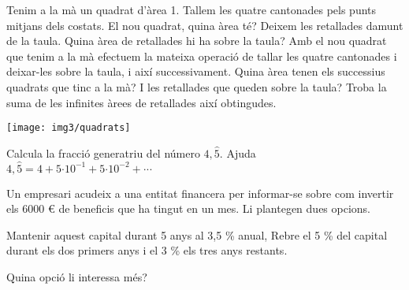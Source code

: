 \begin{mylist}
\exer  Tenim a la mà un quadrat d'àrea 1. Tallem les quatre cantonades pels punts mitjans dels costats. El nou quadrat, quina àrea té? Deixem les retallades damunt de la taula. Quina àrea de retallades hi ha sobre la taula? Amb el nou quadrat que tenim a la mà efectuem la mateixa operació de tallar les quatre cantonades i deixar-les sobre la taula, i així successivament. Quina àrea tenen els successius quadrats que tinc a la mà? I les retallades que queden sobre la taula? Troba la suma de les infinites àrees de retallades així obtingudes.
\begin{center}
	\texttt{[image: img3/quadrats]}
\end{center}

\begin{comment}
\exer  De nou tenim un quadrat d'àrea 1 a la mà, i ho tallem per les línies de punts com indica la figura. El tros major ho deixem sobre la taula i ens quedem a la mà amb el quadrat, al que tornem a tallar de la mateixa forma. I així successivament. Quina àrea tenen els successius quadrats que tinc a la mà? Creixen o disminueixen? Escriu el terme general de la successió d'àrees que tenim a la mà. I les retallades que queden sobre la taula? Creix l'àrea o disminueix? Anem sumant àrees, calcula la suma d'aquestes àrees si haguéssim fet infinits talls.
\end{comment}

\exer  Calcula la fracció generatriu del número $4,\hat{5}$. Ajuda $4,\hat{5}=4+5\textrm{·}{10}^{-1}+5\textrm{·}{10}^{-2}+\textrm{·}\textrm{·}\textrm{·}$

\exer  Un empresari acudeix a una entitat financera per informar-se sobre com invertir els 6000 \euro{} de beneficis que ha tingut en un mes. Li plantegen dues opcions.
\begin{tasks}
\task  Mantenir aquest capital durant 5 anys al 3,5 \% anual, 
\task  Rebre el 5 \% del capital durant els dos primers anys i el 3 \% els tres anys restants. 
\end{tasks}
Quina opció li interessa més?
\end{mylist}
\newpage





